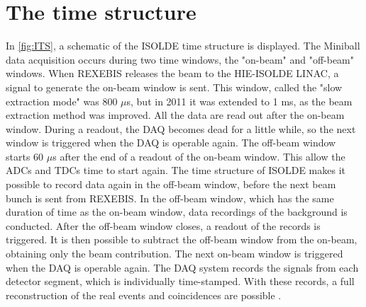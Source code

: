 \documentclass[twoside,english]{uiofysmaster/uiofysmaster}
\let\orgautoref\autoref
\renewcommand{\autoref}
        {%
		 \def\sectionautorefname{Section}%
		 \def\subsectionautorefname{Section}%
		 \def\subsubsectionautorefname{Section}%
		 \def\chapterautorefname{Chapter}%
          \orgautoref}
\begin{document}
\section{The time structure}
In \autoref{fig:ITS}, a schematic of the ISOLDE time structure is displayed. 
The Miniball data acquisition occurs during two time windows, the "on-beam" and "off-beam" windows. 
When REXEBIS releases the beam to the HIE-ISOLDE LINAC, a signal to generate the on-beam window is sent. 
This window, called the "slow extraction mode" was 800 $\mu$s, but in 2011 it was extended to 1 ms, as the beam extraction method was improved. 
All the data are read out after the on-beam window. 
During a readout, the DAQ becomes dead for a little while, so the next window is triggered when the DAQ is operable again.
The off-beam window starts 60 $\mu$s after the end of a readout of the on-beam window.
This allow the ADCs and TDCs time to start again.
The time structure of ISOLDE makes it possible to record data again in the off-beam window, before the next beam bunch is sent from REXEBIS.
In the off-beam window, which has the same duration of time as the on-beam window, data recordings of the background is conducted.
After the off-beam window closes, a readout of the records is triggered.
It is then possible to subtract the off-beam window from the on-beam, obtaining only the beam contribution. 
The next on-beam window is triggered when the DAQ is operable again.
The DAQ system records the signals from each detector segment, which is individually time-stamped. 
With these records, a full reconstruction of the real events and coincidences are possible \cite{NWarr-el}. 
\end{document}
